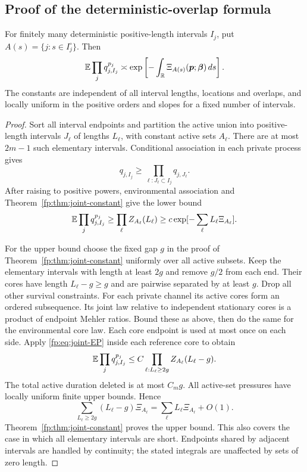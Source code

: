 \subsection{Proof of the deterministic-overlap formula}
\begin{theorem}\label{fp:thm:overlap}
For finitely many deterministic positive-length intervals $I_j$, put
$A(s)=\{j:s\in I_j^\circ\}$. Then
\begin{equation}\label{fp:eq:overlap-main}
 \mathbb E\prod_jq_{j,I_j}^{p_j}
 \asymp\exp\left[-\int_\mathbb R
             \Xi_{A(s)}(\boldsymbol p;\boldsymbol\beta)\,ds\right].
\end{equation}
The constants are independent of all interval lengths, locations and
overlaps, and locally uniform in the positive orders and slopes for
a fixed number of intervals.
\end{theorem}
\begin{proof}
Sort all interval endpoints and partition the active union into positive-length intervals $J_\ell$ of lengths $L_\ell$, with constant active sets $A_\ell$. There are at most $2m-1$ such elementary intervals. Conditional association in each private process gives
\[
 q_{j,I_j}\ge\prod_{\ell:J_\ell\subset I_j}q_{j,J_\ell}.
\]
After raising to positive powers, environmental association and Theorem~\ref{fp:thm:joint-constant} give the lower bound
\[
 \mathbb E\prod_jq_{j,I_j}^{p_j}
 \ge\prod_\ell Z_{A_\ell}(L_\ell)
 \ge c\exp[-\sum_\ell L_\ell\Xi_{A_\ell}].
\]

For the upper bound choose the fixed gap $g$ in the proof of Theorem~\ref{fp:thm:joint-constant} uniformly over all active subsets. Keep the elementary intervals with length at least $2g$ and remove $g/2$ from each end. Their cores have length $L_\ell-g\ge g$ and are pairwise separated by at least $g$. Drop all other survival constraints. For each private channel its active cores form an ordered subsequence. Its joint law relative to independent stationary cores is a product of endpoint Mehler ratios. Bound these as above, then do the same for the environmental core law. Each core endpoint is used at most once on each side. Apply \eqref{fp:eq:joint-EP} inside each reference core to obtain
\[
 \mathbb E\prod_jq_{j,I_j}^{p_j}
 \le C\prod_{\ell:L_\ell\ge2g} Z_{A_\ell}(L_\ell-g).
\]
The total active duration deleted is at most $C_mg$. All active-set pressures have locally uniform finite upper bounds. Hence
\[
 \sum_{L_\ell\ge2g}(L_\ell-g)\Xi_{A_\ell}
 =\sum_\ell L_\ell\Xi_{A_\ell}+O(1).
\]
Theorem~\ref{fp:thm:joint-constant} proves the upper bound. This also covers the case in which all elementary intervals are short. Endpoints shared by adjacent intervals are handled by continuity; the stated integrals are unaffected by sets of zero length.
\end{proof}
